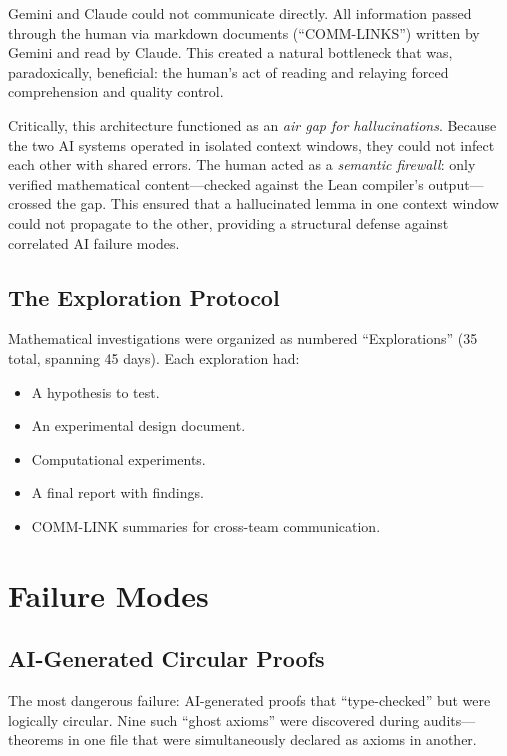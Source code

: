 \documentclass[11pt,a4paper]{article}
\begin{document}
Gemini and Claude could not communicate directly. All information
passed through the human via markdown documents (``COMM-LINKS'')
written by Gemini and read by Claude. This created a natural
bottleneck that was, paradoxically, beneficial: the human's act of
reading and relaying forced comprehension and quality control.

Critically, this architecture functioned as an \emph{air gap for
hallucinations}. Because the two AI systems operated in isolated
context windows, they could not infect each other with shared errors.
The human acted as a \emph{semantic firewall}: only verified
mathematical content---checked against the Lean compiler's
output---crossed the gap. This ensured that a hallucinated lemma
in one context window could not propagate to the other, providing
a structural defense against correlated AI failure modes.

\subsection{The Exploration Protocol}

Mathematical investigations were organized as numbered
``Explorations'' (35 total, spanning 45 days). Each exploration had:
\begin{itemize}
  \item A hypothesis to test.
  \item An experimental design document.
  \item Computational experiments.
  \item A final report with findings.
  \item COMM-LINK summaries for cross-team communication.
\end{itemize}

\section{Failure Modes}

\subsection{AI-Generated Circular Proofs}

The most dangerous failure: AI-generated proofs that ``type-checked''
but were logically circular. Nine such ``ghost axioms'' were
discovered during audits---theorems in one file that were
simultaneously declared as axioms in another.
\end{document}
